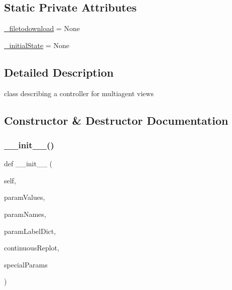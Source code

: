\subsection*{Static Private Attributes}
\begin{DoxyCompactItemize}
\item 
\hyperlink{class_mu_mo_t_1_1_mu_mo_t_s_s_a_controller_a559b8292a88eb343bf8591754cf168ef}{\+\_\+filetodownload} = None
\item 
\hyperlink{class_mu_mo_t_1_1_mu_mo_t_s_s_a_controller_a8afeb8cf5705c6b521f7d6658dab955b}{\+\_\+initial\+State} = None
\end{DoxyCompactItemize}


\subsection{Detailed Description}
class describing a controller for multiagent views 

\subsection{Constructor \& Destructor Documentation}
\mbox{\label{class_mu_mo_t_1_1_mu_mo_t_s_s_a_controller_a203e76c007a565312c5715712851aadb}} 
\subsubsection{\texorpdfstring{\+\_\+\+\_\+init\+\_\+\+\_\+()}{\_\_init\_\_()}}
{\footnotesize\ttfamily def \+\_\+\+\_\+init\+\_\+\+\_\+ (\begin{DoxyParamCaption}\item[{}]{self,  }\item[{}]{param\+Values,  }\item[{}]{param\+Names,  }\item[{}]{param\+Label\+Dict,  }\item[{}]{continuous\+Replot,  }\item[{}]{special\+Params }\end{DoxyParamCaption})}



